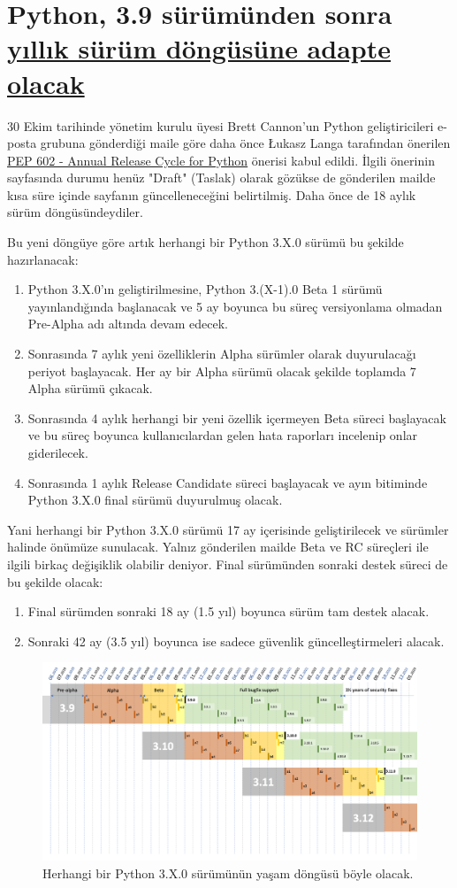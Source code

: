 \documentclass[11pt]{article}
\begin{document}
\section{Python, 3.9 sürümünden sonra \href{https://lwn.net/Articles/803679/}{yıllık sürüm döngüsüne adapte olacak}}
\label{sec:org51fcdfd}
30 Ekim tarihinde yönetim kurulu üyesi Brett Cannon'un Python geliştiricileri
e-posta grubuna gönderdiği maile göre daha önce Łukasz Langa tarafından
önerilen \href{https://www.python.org/dev/peps/pep-0602/}{PEP 602 - Annual Release Cycle for Python} önerisi kabul edildi. İlgili
önerinin sayfasında durumu henüz "Draft" (Taslak) olarak gözükse de gönderilen
mailde kısa süre içinde sayfanın güncelleneceğini belirtilmiş. Daha önce de 18
aylık sürüm döngüsündeydiler.

Bu yeni döngüye göre artık herhangi bir Python 3.X.0 sürümü bu şekilde
hazırlanacak:
\begin{enumerate}
\item Python 3.X.0'ın geliştirilmesine, Python 3.(X-1).0 Beta 1 sürümü
yayınlandığında başlanacak ve 5 ay boyunca bu süreç versiyonlama olmadan
Pre-Alpha adı altında devam edecek.
\item Sonrasında 7 aylık yeni özelliklerin Alpha sürümler olarak duyurulacağı
periyot başlayacak. Her ay bir Alpha sürümü olacak şekilde toplamda 7
Alpha sürümü çıkacak.
\item Sonrasında 4 aylık herhangi bir yeni özellik içermeyen Beta süreci
başlayacak ve bu süreç boyunca kullanıcılardan gelen hata raporları
incelenip onlar giderilecek.
\item Sonrasında 1 aylık Release Candidate süreci başlayacak ve ayın bitiminde
Python 3.X.0 final sürümü duyurulmuş olacak.
\end{enumerate}
Yani herhangi bir Python 3.X.0 sürümü 17 ay içerisinde geliştirilecek ve
sürümler halinde önümüze sunulacak. Yalnız gönderilen mailde Beta ve RC
süreçleri ile ilgili birkaç değişiklik olabilir deniyor. Final sürümünden
sonraki destek süreci de bu şekilde olacak:
\begin{enumerate}
\item Final sürümden sonraki 18 ay (1.5 yıl) boyunca sürüm tam destek alacak.
\item Sonraki 42 ay (3.5 yıl) boyunca ise sadece güvenlik güncelleştirmeleri
alacak.
\end{enumerate}

\begin{figure}[htbp]
\centering
\includegraphics[width=.9\linewidth]{gorseller/python-omur.png}
\caption{Herhangi bir Python 3.X.0 sürümünün yaşam döngüsü böyle olacak.}
\end{figure}
\end{document}
